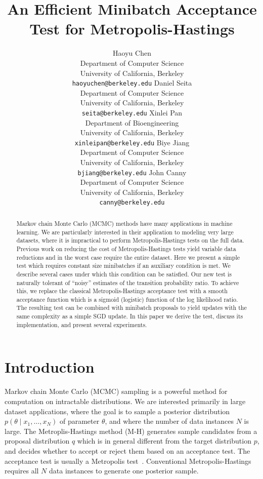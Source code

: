 \documentclass{article}
\title{An Efficient Minibatch Acceptance Test for Metropolis-Hastings}
\author{
  Haoyu Chen \\
  Department of Computer Science \\
  University of California, Berkeley \\
  \texttt{haoyuchen@berkeley.edu}
  \And
  Daniel Seita \\
  Department of Computer Science \\
  University of California, Berkeley \\
  \texttt{seita@berkeley.edu}
  \And
  Xinlei Pan \\
  Department of Bioengineering \\
  University of California, Berkeley \\
  \texttt{xinleipan@berkeley.edu}
  \And 
  Biye Jiang \\
  Department of Computer Science \\
  University of California, Berkeley \\
  \texttt{bjiang@berkeley.edu}
  \And
  John Canny \\
  Department of Computer Science \\
  University of California, Berkeley \\
  \texttt{canny@berkeley.edu}
}
\begin{document}
\maketitle

\begin{abstract}
Markov chain Monte Carlo (MCMC) methods have many applications in
machine learning. We are particularly interested in their application
to modeling very large datasets, where it is impractical to perform
Metropolis-Hastings tests on the full data. Previous work on reducing
the cost of Metropolis-Hastings tests yield variable data reductions
and in the worst case require the entire dataset.  Here we present a
simple test which requires constant size minibatches if an auxiliary
condition is met. We describe several cases under which this condition
can be satisfied. Our new test is naturally tolerant of ``noisy''
estimates of the transition probability ratio. To achieve this, we
replace the classical Metropolis-Hastings acceptance test with a
smooth acceptance function which is a sigmoid (logistic)
function of the log likelihood ratio.
The resulting test can be combined with minibatch proposals to yield
updates with the same complexity as a simple SGD update. In this paper
we derive the test, discuss its implementation, and present several
experiments.
\end{abstract}



\section{Introduction}\label{sec:introduction}

Markov chain Monte Carlo (MCMC) sampling is a powerful method for
computation on intractable distributions. We are interested primarily
in large dataset applications, where the goal is to sample a posterior
distribution $p(\theta \mid x_1, \ldots, x_N)$ of parameter $\theta$,
and where the number of data instances $N$ is large.  The
Metroplis-Hastings method (M-H) generates sample candidates from a
proposal distribution $q$ which is in general different from the
target distribution $p$, and decides whether to accept or reject them
based on an acceptance test. The acceptance test is usually a
Metropolis test~\cite{Metropolis1953,hastings70}. Conventional
Metropolis-Hastings requires all $N$ data instances to generate one
posterior sample.
\end{document}

